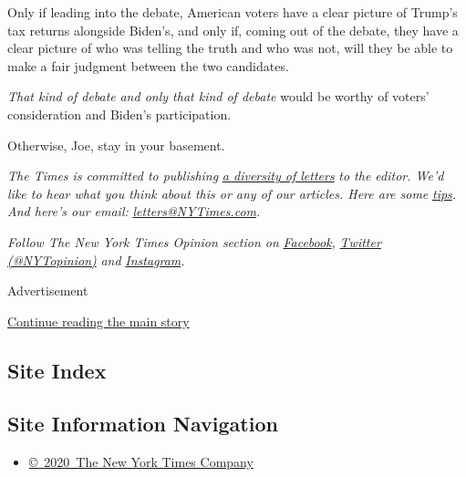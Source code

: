 Only if leading into the debate, American voters have a clear picture of
Trump's tax returns alongside Biden's, and only if, coming out of the
debate, they have a clear picture of who was telling the truth and who
was not, will they be able to make a fair judgment between the two
candidates.

\emph{That kind of debate} \emph{and only that kind of debate} would be
worthy of voters' consideration and Biden's participation.

Otherwise, Joe, stay in your basement.

\emph{The Times is committed to publishing}
\href{https://www.nytimes3xbfgragh.onion/2019/01/31/opinion/letters/letters-to-editor-new-york-times-women.html}{\emph{a
diversity of letters}} \emph{to the editor. We'd like to hear what you
think about this or any of our articles. Here are some}
\href{https://help.nytimes3xbfgragh.onion/hc/en-us/articles/115014925288-How-to-submit-a-letter-to-the-editor}{\emph{tips}}\emph{.
And here's our email:}
\href{mailto:letters@NYTimes.com}{\emph{letters@NYTimes.com}}\emph{.}

\emph{Follow The New York Times Opinion section on}
\href{https://www.facebookcorewwwi.onion/nytopinion}{\emph{Facebook}}\emph{,}
\href{http://twitter.com/NYTOpinion}{\emph{Twitter (@NYTopinion)}}
\emph{and}
\href{https://www.instagram.com/nytopinion/}{\emph{Instagram}}\emph{.}

Advertisement

\protect\hyperlink{after-bottom}{Continue reading the main story}

\hypertarget{site-index}{%
\subsection{Site Index}\label{site-index}}

\hypertarget{site-information-navigation}{%
\subsection{Site Information
Navigation}\label{site-information-navigation}}

\begin{itemize}
\tightlist
\item
  \href{https://help.nytimes3xbfgragh.onion/hc/en-us/articles/115014792127-Copyright-notice}{©~2020~The
  New York Times Company}
\end{itemize}

